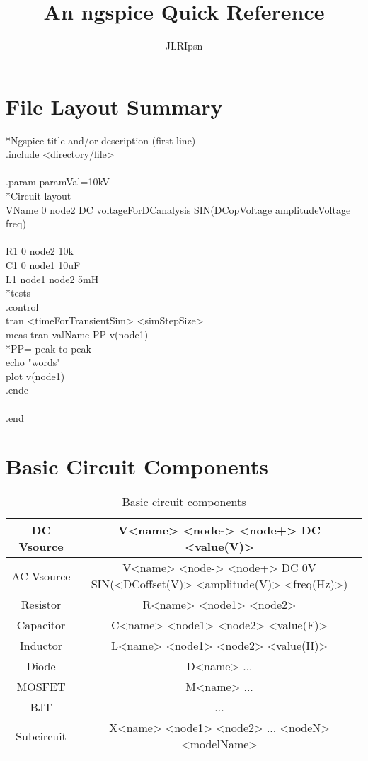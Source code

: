 \documentclass[a4paper]{article}
\author{JLRIpsn}
\title{An ngspice Quick Reference}
\begin{document}
\maketitle
\section{File Layout Summary}

*Ngspice title and/or description (first line) \\
.include <directory/file>\\
\\
.param paramVal=10kV\\
*Circuit layout\\
VName 0 node2 DC voltageForDCanalysis SIN(DCopVoltage amplitudeVoltage freq)\\
\\
R1 0 node2 10k\\
C1 0 node1 10uF\\
L1 node1 node2 5mH\\

*tests\\
.control\\
tran <timeForTransientSim> <simStepSize>\\
meas tran valName PP v(node1)\\
*PP= peak to peak\\
echo "words"\\
plot v(node1)\\
.endc\\
\\
.end
\section{Basic Circuit Components}
\begin{table}[!ht]
	\begin{tabular}{| c | c |}
		\hline
		DC Vsource & V<name> <node-> <node+> DC <value(V)> \\
		\hline
		AC Vsource & V<name> <node-> <node+> DC 0V SIN(<DCoffset(V)> <amplitude(V)> <freq(Hz)>) \\
		\hline
		Resistor & R<name> <node1> <node2> \\
		\hline
		Capacitor & C<name> <node1> <node2> <value(F)> \\
		\hline
		Inductor & L<name> <node1> <node2> <value(H)> \\
		\hline
		Diode & D<name> ... \\
		\hline
		MOSFET & M<name> ... \\
		\hline
		BJT & ... \\
		\hline
		Subcircuit & X<name> <node1> <node2> ... <nodeN> <modelName>\\
		\hline
	\end{tabular}
	\caption{\label{tab:comps} Basic circuit components}
\end{table}
\end{document}

